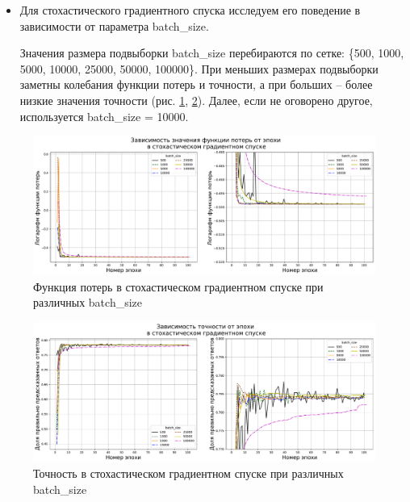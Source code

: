 \documentclass{article}
\begin{document}
\begin{itemize}
\item Для стохастического градиентного спуска исследуем его поведение в зависимости от параметра batch\_size. 

Значения размера подвыборки batch\_size перебираются по сетке: \{500, 1000, 5000, 10000, 25000, 50000, 100000\}. При меньших размерах подвыборки заметны колебания функции потерь и точности, а при больших – более низкие значения точности (рис. \ref{fig:batch_loss_SGD}, \ref{fig:batch_accuracy_SGD}). Далее, если не оговорено другое, используется batch\_size = 10000.


\end{itemize}


\begin{figure}[H]
	\centering
	\includegraphics[width=15cm]{TASK2 batch loss SGD.pdf}
	\caption{Функция потерь в стохастическом градиентном спуске при различных batch\_size}
	\label{fig:batch_loss_SGD}
\end{figure}
\begin{figure}[H]
	\centering
	\includegraphics[width=15cm]{TASK2 batch accuracy SGD.pdf}
	\caption{Точность в стохастическом градиентном спуске при различных batch\_size}
	\label{fig:batch_accuracy_SGD}
\end{figure}

\end{document}
